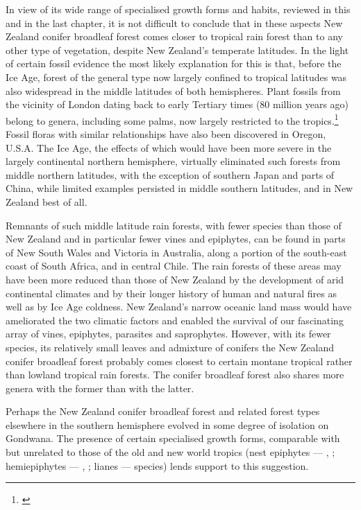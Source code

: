 In view of its wide range of specialised growth forms and habits, reviewed in this and in the last chapter, it is not difficult to conclude that in these aspects New Zealand conifer broadleaf forest comes closer to tropical rain forest than to any other type of vegetation, despite New Zealand's temperate latitudes.
In the light of certain fossil evidence the most likely explanation for this is that, before the Ice Age, forest of the general type now largely confined to tropical latitudes was also widespread in the middle latitudes of both hemispheres.
Plant fossils from the vicinity of London dating back to early Tertiary times (80 million years ago) belong to genera, including some palms, now largely restricted to the tropics.\footnote{\cite{chandler1964lower}}
Fossil floras with similar relationships have also been discovered in Oregon, U.S.A.
The Ice Age, the effects of which would have been more severe in the largely continental northern hemisphere, virtually eliminated such forests from middle northern latitudes, with the exception of southern Japan and parts of China, while limited examples persisted in middle southern latitudes, and in New Zealand best of all.

Remnants of such middle latitude rain forests, with fewer species than those of New Zealand and in particular fewer vines and epiphytes, can be found in parts of New South Wales and Victoria in Australia, along a portion of the south-east coast of South Africa, and in central Chile.
The rain forests of these areas may have been more reduced than those of New Zealand by the development of arid continental climates and by their longer history of human and natural fires as well as by Ice Age coldness.
New Zealand's narrow oceanic land mass would have ameliorated the two climatic factors and enabled the survival of our fascinating array of vines, epiphytes, parasites and saprophytes.
However, with its fewer species, its relatively small leaves and admixture of conifers the New Zealand conifer broadleaf forest probably comes closest to certain montane tropical rather than lowland tropical rain forests.
The conifer broadleaf forest also shares more genera with the former than with the latter.

Perhaps the New Zealand conifer broadleaf forest and related forest types elsewhere in the southern hemisphere evolved in some degree of isolation on Gondwana.
The presence of certain specialised growth forms, comparable with but unrelated to those of the old and new world tropics (nest epiphytes --- , ; hemiepiphytes --- , ; lianes ---  species) lends support to this suggestion.

